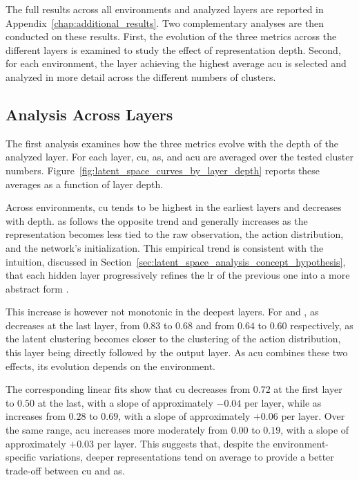 The full results across all environments and analyzed layers are reported in Appendix~\ref{chap:additional_results}.
Two complementary analyses are then conducted on these results.
First, the evolution of the three metrics across the different layers is examined to study the effect of representation depth.
Second, for each environment, the layer achieving the highest average \gls{acu} is selected and analyzed in more detail across the different numbers of clusters.

\subsection{Analysis Across Layers}

The first analysis examines how the three metrics evolve with the depth of the analyzed layer.
For each layer, \gls{cu}, \gls{as}, and \gls{acu} are averaged over the tested cluster numbers.
Figure~\ref{fig:latent_space_curves_by_layer_depth} reports these averages as a function of layer depth.



Across environments, \gls{cu} tends to be highest in the earliest layers and decreases with depth.
\gls{as} follows the opposite trend and generally increases as the representation becomes less tied to the raw observation, the action distribution, and the network's initialization.
This empirical trend is consistent with the intuition, discussed in Section~\ref{sec:latent_space_analysis_concept_hypothesis}, that each hidden layer progressively refines the \gls{lr} of the previous one into a more abstract form \parencite{rumelhart1986learning}.

This increase is however not monotonic in the deepest layers.
For \MarioBrosName and \MsPacManName, \gls{as} decreases at the last layer, from $0.83$ to $0.68$ and from $0.64$ to $0.60$ respectively, as the latent clustering becomes closer to the clustering of the action distribution, this layer being directly followed by the output layer.
As \gls{acu} combines these two effects, its evolution depends on the environment.

The corresponding linear fits show that \gls{cu} decreases from $0.72$ at the first layer to $0.50$ at the last, with a slope of approximately $-0.04$ per layer, while \gls{as} increases from $0.28$ to $0.69$, with a slope of approximately $+0.06$ per layer.
Over the same range, \gls{acu} increases more moderately from $0.00$ to $0.19$, with a slope of approximately $+0.03$ per layer.
This suggests that, despite the environment-specific variations, deeper representations tend on average to provide a better trade-off between \gls{cu} and \gls{as}.

